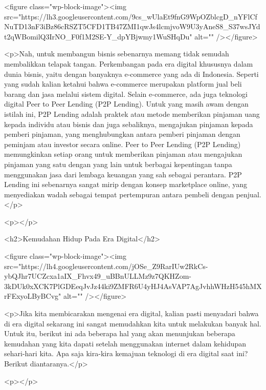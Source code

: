<figure class="wp-block-image"><img src="https://lh3.googleusercontent.com/9cs_wUlaEt9fnG9WpOZblcgD_nYFlCfNuTD13nF3iBz86cRSZT5CFD1TB47ZMI1qwJs4lcmjvoW9U3yAneS8_S37wsJYdt2qWBomilQ3IrNO_F0f1M2SE-Y_dpYBjwmy1WuSHqDu" alt="" /></figure>



<p>Nah, untuk membangun bisnis sebenarnya memang tidak semudah membalikkan telapak tangan. Perkembangan pada era digital khususnya dalam dunia bisnis, yaitu dengan banyaknya e-commerce yang ada di Indonesia. Seperti yang sudah kalian ketahui bahwa e-commerce merupakan platform jual beli barang dan jasa melalui sistem digital. Selain e-commerce, ada juga teknologi digital Peer to Peer Lending (P2P Lending). Untuk yang masih awam dengan istilah ini, P2P Lending adalah praktek atau metode memberikan pinjaman uang kepada individu atau bisnis dan juga sebaliknya, mengajukan pinjaman kepada pemberi pinjaman, yang menghubungkan antara pemberi pinjaman dengan peminjam atau investor secara online. Peer to Peer Lending (P2P Lending) memungkinkan setiap orang untuk memberikan pinjaman atau mengajukan pinjaman yang satu dengan yang lain untuk berbagai kepentingan tanpa menggunakan jasa dari lembaga keuangan yang sah sebagai perantara. P2P Lending ini sebenarnya sangat mirip dengan konsep marketplace online, yang menyediakan wadah sebagai tempat pertempuran antara pembeli dengan penjual.</p>



<p></p>



<h2>Kemudahan Hidup Pada Era Digital</h2>



<figure class="wp-block-image"><img src="https://lh4.googleusercontent.com/jOSe_Z9RarIUw2RkCs-ybQJhr7UCZcxa1aIX_Fhvx49_uBBnULLMz9z7QKHZom-3kDUk0xXCK7PlGDEeqJvJz44ki9ZMFR6U4yHJ4AsVAP7AgJvhhWHzH545hMXrFExyoLByBCvg" alt="" /></figure>



<p>Jika kita membicarakan mengenai era digital, kalian pasti menyadari bahwa di era digital sekarang ini sangat memudahkan kita untuk melakukan banyak hal. Untuk itu, berikut ini ada beberapa hal yang akan menunjukan beberapa kemudahan yang kita dapati setelah menggunakan internet dalam kehidupan sehari-hari kita. Apa saja kira-kira kemajuan teknologi di era digital saat ini? Berikut diantaranya.</p>



<p></p>



